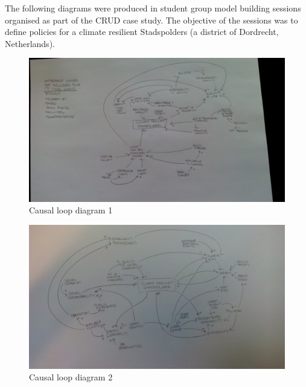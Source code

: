 \documentclass[]{article}
\begin{document}
The following diagrams were produced in student group model building
sessions organised as part of the CRUD case study.  The objective of
the sessions was to define policies for a climate resilient
Stadspolders (a district of Dordrecht, Netherlands).

\clearpage

\begin{figure}
  \includegraphics[width=\textwidth]{../cl1.png}
  \caption{Causal loop diagram 1}
  \label{fig:cl1}%
\end{figure}

\begin{figure}
  \includegraphics[width=\textwidth]{../cl2.png}
  \caption{Causal loop diagram 2}
  \label{fig:cl2}%
\end{figure}
\end{document}
